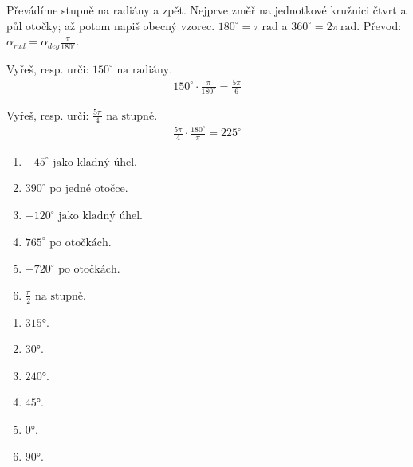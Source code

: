 \documentclass[11pt,a4paper]{article}
\begin{document}
Převádíme stupně na radiány a zpět. Nejprve změř na jednotkové kružnici čtvrt a půl otočky; až potom napiš obecný vzorec.
$180^\circ=\pi\,\mathrm{rad}$ a $360^\circ=2\pi\,\mathrm{rad}$. Převod: $\alpha_{rad}=\alpha_{deg}\frac{\pi}{180^\circ}$.
\begin{prikladReseniBox}[title={Příklad 1}]
Vyřeš, resp. urči: $150^\circ\text{ na radiány}$.
\tcblower
\[\begin{aligned}150^\circ\cdot\frac{\pi}{180^\circ}=\frac{5\pi}{6}\end{aligned}\]
\end{prikladReseniBox}
\begin{prikladReseniBox}[title={Příklad 2}]
Vyřeš, resp. urči: $\frac{5\pi}{4}\text{ na stupně}$.
\tcblower
\[\begin{aligned}\frac{5\pi}{4}\cdot\frac{180^\circ}{\pi}=225^\circ\end{aligned}\]
\end{prikladReseniBox}
\begin{zadaniReseniBox}[title={Samostatná práce 1}]
\begin{enumerate}[label=\alph*)]
\item $-45^\circ\text{ jako kladný úhel}$.
\item $390^\circ\text{ po jedné otočce}$.
\item $-120^\circ\text{ jako kladný úhel}$.
\item $765^\circ\text{ po otočkách}$.
\item $-720^\circ\text{ po otočkách}$.
\item $\frac{\pi}{2}\text{ na stupně}$.
\end{enumerate}
\tcblower
\begin{enumerate}[label=\alph*)]
\item $315°$.
\item $30°$.
\item $240°$.
\item $45°$.
\item $0°$.
\item $90°$.
\end{enumerate}
\end{zadaniReseniBox}
\end{document}
